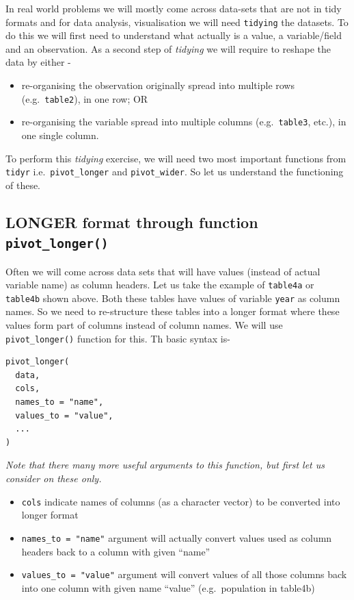 \documentclass[
]{book}
\providecommand{\tightlist}{%
  \setlength{\itemsep}{0pt}\setlength{\parskip}{0pt}}
\begin{document}
In real world problems we will mostly come across data-sets that are not in tidy formats and for data analysis, visualisation we will need \texttt{tidying} the datasets. To do this we will first need to understand what actually is a value, a variable/field and an observation. As a second step of \emph{tidying} we will require to reshape the data by either -

\begin{itemize}
\tightlist
\item
  re-organising the observation originally spread into multiple rows (e.g.~\texttt{table2}), in one row; OR
\item
  re-organising the variable spread into multiple columns (e.g.~\texttt{table3}, etc.), in one single column.
\end{itemize}

To perform this \emph{tidying} exercise, we will need two most important functions from \texttt{tidyr} i.e.~\texttt{pivot\_longer} and \texttt{pivot\_wider}. So let us understand the functioning of these.

\hypertarget{longer-format-through-function-pivot_longer}{%
\subsection{\texorpdfstring{LONGER format through function \texttt{pivot\_longer()}}{LONGER format through function pivot\_longer()}}\label{longer-format-through-function-pivot_longer}}

Often we will come across data sets that will have values (instead of actual variable name) as column headers. Let us take the example of \texttt{table4a} or \texttt{table4b} shown above. Both these tables have values of variable \texttt{year} as column names. So we need to re-structure these tables into a longer format where these values form part of columns instead of column names. We will use \texttt{pivot\_longer()} function for this. Th basic syntax is-

\begin{verbatim}
pivot_longer(
  data,
  cols,
  names_to = "name",
  values_to = "value",
  ...
)
\end{verbatim}

\emph{Note that there many more useful arguments to this function, but first let us consider on these only.}

\begin{itemize}
\tightlist
\item
  \texttt{cols} indicate names of columns (as a character vector) to be converted into longer format
\item
  \texttt{names\_to\ =\ "name"} argument will actually convert values used as column headers back to a column with given ``name''
\item
  \texttt{values\_to\ =\ "value"} argument will convert values of all those columns back into one column with given name ``value'' (e.g.~population in table4b)
\end{itemize}
\end{document}
